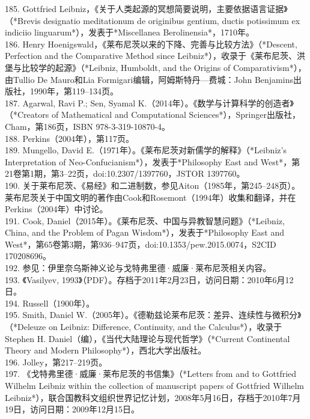 185. Gottfried Leibniz，《关于人类起源的冥想简要说明，主要依据语言证据》（*Brevis designatio meditationum de originibus gentium, ductis potissimum ex indiciio linguarum*），发表于*Miscellanea Berolinensia*，1710年。\\
186. Henry Hoenigswald，《莱布尼茨以来的下降、完善与比较方法》（*Descent, Perfection and the Comparative Method since Leibniz*），收录于《莱布尼茨、洪堡与比较学的起源》（*Leibniz, Humboldt, and the Origins of Comparativism*），由Tullio De Mauro和Lia Formigari编辑，阿姆斯特丹—费城：John Benjamins出版社，1990年，第119–134页。\\
187. Agarwal, Ravi P.; Sen, Syamal K.（2014年）。《数学与计算科学的创造者》（*Creators of Mathematical and Computational Sciences*），Springer出版社，Cham，第186页，ISBN 978-3-319-10870-4。\\
188. Perkins（2004年），第117页。\\
189. Mungello, David E.（1971年）。《莱布尼茨对新儒学的解释》（*Leibniz's Interpretation of Neo-Confucianism*），发表于*Philosophy East and West*，第21卷第1期，第3–22页，doi:10.2307/1397760，JSTOR 1397760。\\
190. 关于莱布尼茨、《易经》和二进制数，参见Aiton（1985年，第245–248页）。莱布尼茨关于中国文明的著作由Cook和Rosemont（1994年）收集和翻译，并在Perkins（2004年）中讨论。\\
191. Cook, Daniel（2015年）。《莱布尼茨、中国与异教智慧问题》（*Leibniz, China, and the Problem of Pagan Wisdom*），发表于*Philosophy East and West*，第65卷第3期，第936–947页，doi:10.1353/pew.2015.0074，S2CID 170208696。\\
192. 参见：伊里奈乌斯神义论与戈特弗里德·威廉·莱布尼茨相关内容。\\
193. 《Vasilyev, 1993》（PDF）。存档于2011年2月23日，访问日期：2010年6月12日。\\
194. Russell（1900年）。\\
195. Smith, Daniel W.（2005年）。《德勒兹论莱布尼茨：差异、连续性与微积分》（*Deleuze on Leibniz: Difference, Continuity, and the Calculus*），收录于Stephen H. Daniel（编），《当代大陆理论与现代哲学》（*Current Continental Theory and Modern Philosophy*），西北大学出版社。\\
196. Jolley，第217–219页。\\
197. 《戈特弗里德·威廉·莱布尼茨的书信集》（*Letters from and to Gottfried Wilhelm Leibniz within the collection of manuscript papers of Gottfried Wilhelm Leibniz*），联合国教科文组织世界记忆计划，2008年5月16日，存档于2010年7月19日，访问日期：2009年12月15日。\\
